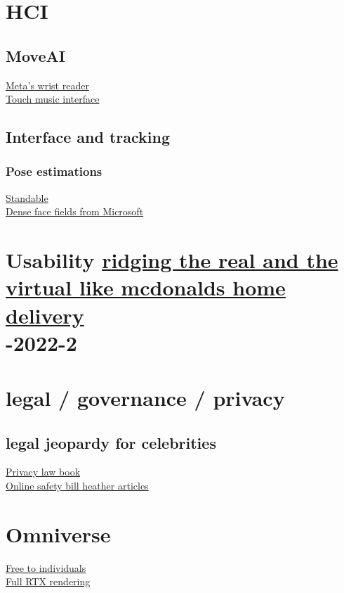 \section{HCI}
\subsection{MoveAI}
\href{https://www.from-the-interface.com/wrist-interfaces/}{Meta's wrist reader}\\
\href{https://scitechdaily.com/groundbreaking-new-technology-allows-people-to-listen-to-music-through-touch/}{Touch music interface}\\
\subsection{Interface and tracking}
\subsubsection{Pose estimations}
\href{https://www.standablevr.com/}{Standable}\\
\href{https://microsoft.github.io/DenseLandmarks/}{Dense face fields from Microsoft}\\
\section{Usability
\href{https://www.businessinsider.com/mcdonalds-metaverse-virtual-online-restaurant-trademark-delivers-fod-web3-nft}{ridging the real and the virtual like mcdonalds home delivery}\\-2022-2}
\section{legal / governance / privacy}
\subsection{legal jeopardy for celebrities}
\href{https://www.smashingmagazine.com/printed-books/understanding-privacy/#bookTOC}{Privacy law book}\\
\href{https://webdevlaw.uk/2022/11/21/a-quick-hypothetical-situation-or-your-crash-introduction-to-the-real-world/}{Online safety bill heather articles}\\
\section{Omniverse}
\href{https://blogs.nvidia.com/blog/2022/01/04/omniverse-available-free-to-creators/}{Free to individuals}\\
\href{https://www.youtube.com/watch?v=Jm155QkRjl0&feature=youtu.be}{Full RTX rendering}\\
